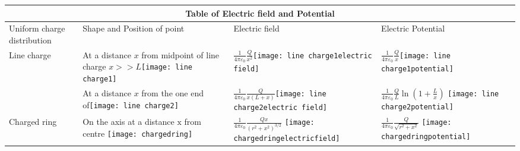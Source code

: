\newpage

\begin{table}[H]
	
	\centering
	\begin{tabular}{|p{3.5cm}|p{3.8cm}|p{4.6cm}|p{4.2cm}|}
		\hline
		\multicolumn{4}{|c|}{\textbf{Table of Electric field and Potential}}\\\hline\hline
		Uniform charge distribution&Shape and Position of point&Electric field&Electric Potential\\\hline
		\multirow{2}{*}{Line charge}& At a distance $x$ from midpoint of line charge
		$x>>L$\newline \texttt{[image: line charge1]}
		&$\frac{1}{4 \pi \varepsilon_{0}} \frac{Q}{x^{2}}$\newline\newline  \texttt{[image: line charge1electric field]}&$\frac{1}{4 \pi \varepsilon_{0}} \frac{Q}{x}$\newline\newline  \texttt{[image: line charge1potential]}\\\cline{2-4}
		
		&At a distance $x$ from the one end of\newline \newline \texttt{[image: line charge2]}   &$\frac{1}{4 \pi \varepsilon_{0}} \frac{Q}{x(L+x)}$\newline \newline \texttt{[image: line charge2electric field]}   &$\frac{1}{4 \pi \varepsilon_{0}} \frac{Q}{L} \ln \left(1+\frac{L}{x}\right)$ \newline\newline \texttt{[image: line charge2potential]} \\\hline
		
		Charged ring&On the axis at a distance $\mathrm{x}$ from
		centre \newline\newline \texttt{[image: chargedring]}  &$\frac{1}{4 \pi \varepsilon_{0}} \frac{Q x}{\left(r^{2}+x^{2}\right)^{3 / 2}} $ \newline\newline \texttt{[image: chargedringelectricfield]} &$\frac{1}{4 \pi \varepsilon_{0}} \frac{Q}{\sqrt{r^{2}+x^{2}}}$ \newline\newline \texttt{[image: chargedringpotential]}\\\hline
		

\end{tabular}
\end{table}
